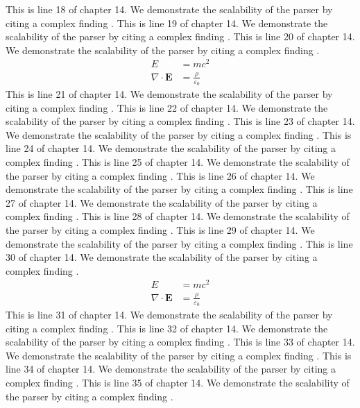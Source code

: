 This is line 18 of chapter 14. We demonstrate the scalability of the parser by citing a complex finding \cite{ref14_18}.
This is line 19 of chapter 14. We demonstrate the scalability of the parser by citing a complex finding \cite{ref14_19}.
This is line 20 of chapter 14. We demonstrate the scalability of the parser by citing a complex finding \cite{ref14_20}.
\begin{align*}
  E &= mc^2 \\
  \nabla \cdot \mathbf{E} &= \frac{\rho}{\varepsilon_0}
\end{align*}
This is line 21 of chapter 14. We demonstrate the scalability of the parser by citing a complex finding \cite{ref14_21}.
This is line 22 of chapter 14. We demonstrate the scalability of the parser by citing a complex finding \cite{ref14_22}.
This is line 23 of chapter 14. We demonstrate the scalability of the parser by citing a complex finding \cite{ref14_23}.
This is line 24 of chapter 14. We demonstrate the scalability of the parser by citing a complex finding \cite{ref14_24}.
This is line 25 of chapter 14. We demonstrate the scalability of the parser by citing a complex finding \cite{ref14_25}.
This is line 26 of chapter 14. We demonstrate the scalability of the parser by citing a complex finding \cite{ref14_26}.
This is line 27 of chapter 14. We demonstrate the scalability of the parser by citing a complex finding \cite{ref14_27}.
This is line 28 of chapter 14. We demonstrate the scalability of the parser by citing a complex finding \cite{ref14_28}.
This is line 29 of chapter 14. We demonstrate the scalability of the parser by citing a complex finding \cite{ref14_29}.
This is line 30 of chapter 14. We demonstrate the scalability of the parser by citing a complex finding \cite{ref14_30}.
\begin{align*}
  E &= mc^2 \\
  \nabla \cdot \mathbf{E} &= \frac{\rho}{\varepsilon_0}
\end{align*}
This is line 31 of chapter 14. We demonstrate the scalability of the parser by citing a complex finding \cite{ref14_31}.
This is line 32 of chapter 14. We demonstrate the scalability of the parser by citing a complex finding \cite{ref14_32}.
This is line 33 of chapter 14. We demonstrate the scalability of the parser by citing a complex finding \cite{ref14_33}.
This is line 34 of chapter 14. We demonstrate the scalability of the parser by citing a complex finding \cite{ref14_34}.
This is line 35 of chapter 14. We demonstrate the scalability of the parser by citing a complex finding \cite{ref14_35}.
